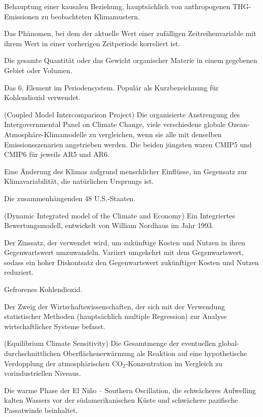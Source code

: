 \documentclass[12pt,paper=a4,DIV=12,parskip=never,chapterprefix=false,headings=standardclasses]{scrreprt}
\begin{document}
\begin{glossar}
\item[ATTRIBUTION] Behauptung einer kausalen Beziehung, hauptsächlich von anthropogenen THG-Emissionen zu beobachteten Klimamustern.
\item[AUTOKORRELATION] Das Phänomen, bei dem der aktuelle Wert einer zufälligen Zeitreihenvariable mit ihrem Wert in einer vorherigen Zeitperiode korreliert ist.
\item[BIOMASSE] Die gesamte Quantität oder das Gewicht organischer Materie in einem gegebenen Gebiet oder Volumen.
\item[CARBON] Das 6. Element im Periodensystem. Populär als Kurzbezeichnung für Kohlendioxid verwendet.
\item[CMIP] (Coupled Model Intercomparison Project) Die organisierte Anstrengung des Intergovernmental Panel on Climate Change, viele verschiedene globale Ozean-Atmosphäre-Klimamodelle zu vergleichen, wenn sie alle mit denselben Emissionsszenarien angetrieben werden. Die beiden jüngsten waren CMIP5 und CMIP6 für jeweils AR5 und AR6.
\item[KLIMAWANDEL] Eine Änderung des Klimas aufgrund menschlicher Einflüsse, im Gegensatz zur Klimavariabilität, die natürlichen Ursprungs ist.
\item[CONUS] Die zusammenhängenden 48 U.S.-Staaten.
\item[DICE] (Dynamic Integrated model of the Climate and Economy) Ein Integriertes Bewertungsmodell, entwickelt von William Nordhaus im Jahr 1993.
\item[DISKONTSATZ] Der Zinssatz, der verwendet wird, um zukünftige Kosten und Nutzen in ihren Gegenwartswert umzuwandeln. Variiert umgekehrt mit dem Gegenwartswert, sodass ein hoher Diskontsatz den Gegenwartswert zukünftiger Kosten und Nutzen reduziert.
\item[TROCKENEIS] Gefrorenes Kohlendioxid.
\item[ÖKONOMETRIE] Der Zweig der Wirtschaftswissenschaften, der sich mit der Verwendung statistischer Methoden (hauptsächlich multiple Regression) zur Analyse wirtschaftlicher Systeme befasst.
\item[ECS] (Equilibrium Climate Sensitivity) Die Gesamtmenge der eventuellen global-durch\-schnitt\-lichen Oberflächenerwärmung als Reaktion auf eine hypothetische Verdopplung der atmosphärischen CO$_2$-Konzentration im Vergleich zu vorindustriellen Niveaus.
\item[EL NIÑO] Die warme Phase der El Niño – Southern Oscillation, die schwächeres Aufwelling kalten Wassers vor der südamerikanischen Küste und schwächere pazifische Passatwinde beinhaltet.

\end{glossar}
\end{document}
